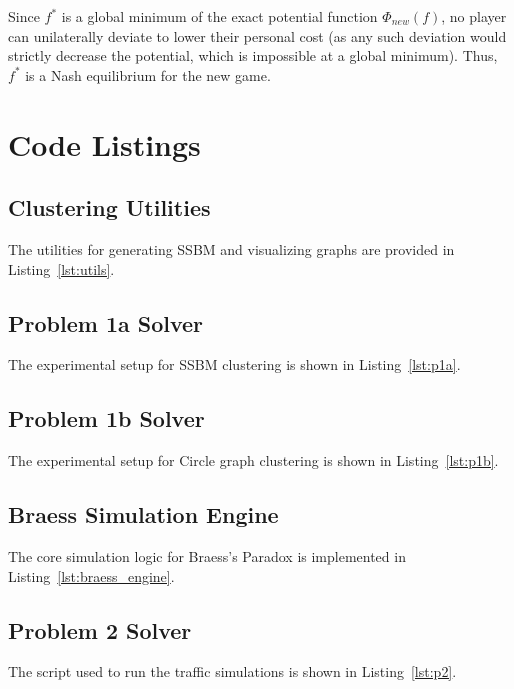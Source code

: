 \documentclass[11pt]{article}
\begin{document}
Since $f^*$ is a global minimum of the exact potential function $\Phi_{new}(f)$, no player can unilaterally deviate to lower their personal cost (as any such deviation would strictly decrease the potential, which is impossible at a global minimum). Thus, $f^*$ is a Nash equilibrium for the new game.

\newpage
\appendix
\section{Code Listings}

\subsection{Clustering Utilities}
The utilities for generating SSBM and visualizing graphs are provided in Listing~\ref{lst:utils}.


\subsection{Problem 1a Solver}
The experimental setup for SSBM clustering is shown in Listing~\ref{lst:p1a}.


\subsection{Problem 1b Solver}
The experimental setup for Circle graph clustering is shown in Listing~\ref{lst:p1b}.


\subsection{Braess Simulation Engine}
The core simulation logic for Braess's Paradox is implemented in Listing~\ref{lst:braess_engine}.


\subsection{Problem 2 Solver}
The script used to run the traffic simulations is shown in Listing~\ref{lst:p2}.

\end{document}
